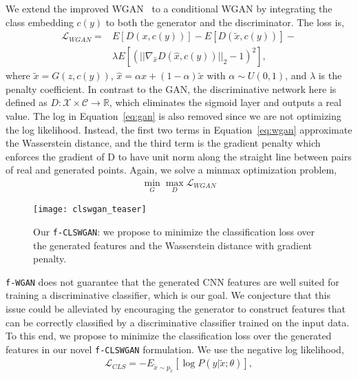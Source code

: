 \documentclass[10pt,twocolumn,letterpaper]{article}
\newcommand{\myparagraph}[1]{\vspace{6pt}\noindent{\bf #1}}
\begin{document}
\myparagraph{\texttt{f-WGAN}.} 
We extend the improved WGAN~\cite{gulrajani2017improved} 
to a conditional WGAN by integrating the class embedding $c(y)$ to both the generator and the discriminator. The loss is, 
\begin{align}
\label{eq:wgan}
\mathcal{L}_{WGAN} =& E[D(x,c(y))] - E[D(\tilde{x},c(y))] -  \\ 
                   & \lambda E[\left(||\nabla_{\hat{x}} D(\hat{x},c(y))||_2 - 1\right)^2], \nonumber
\end{align}
where $\tilde{x}=G(z,c(y))$, $\hat{x}=\alpha x + (1-\alpha) \tilde{x}$ with $\alpha \sim U(0,1)$, and $\lambda$ is the penalty coefficient. In contrast to the GAN, the discriminative network here is defined as $D: \mathcal{X} \times \mathcal{C} \rightarrow \mathbb{R}$, which eliminates the sigmoid layer and outputs a real value. The log in Equation~\ref{eq:gan} is also removed since we are not optimizing the log likelihood. Instead, the first two terms in Equation~\ref{eq:wgan} approximate the Wasserstein distance, and the third term is the gradient penalty which enforces the gradient of D to have unit norm along the straight line between pairs of real and generated points. Again, we solve a minmax optimization problem, 
\begin{align}
 \min_G \max_D \mathcal{L}_{WGAN}
\end{align}

\begin{figure}[t]
	\centering
\texttt{[image: clswgan\_teaser]}
	\caption{Our \texttt{f-CLSWGAN}: we propose to minimize the classification loss over the generated features and the Wasserstein distance with gradient penalty.}
\vspace{-3mm}
	\label{fig:teaser}
\end{figure}

\myparagraph{\texttt{f-CLSWGAN}.} \texttt{f-WGAN} does not guarantee that the generated CNN features are well suited for training a discriminative classifier, which is our goal. We conjecture that this issue could be alleviated by encouraging the generator to construct features that can be correctly classified by a discriminative classifier trained on the input data. To this end, we propose to minimize the classification loss over the generated features in our novel \texttt{f-CLSWGAN} formulation. We use the negative log likelihood, 
\begin{align}
\mathcal{L}_{CLS} = -E_{\tilde{x}\sim p_{\tilde{x}}}[\log P(y| \tilde{x}; \theta)], 
\end{align}
\end{document}
